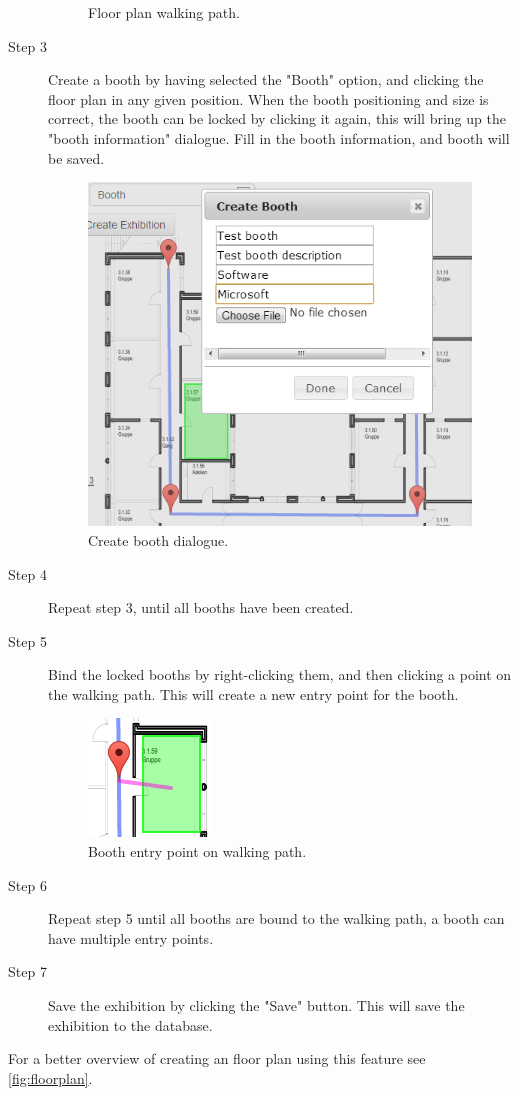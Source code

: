 \begin{description}
\begin{figure}[H]
		\caption{Floor plan walking path.\label{fig:websitestep2}}
	\end{figure}
	\item[Step 3] Create a booth by having selected the "Booth" option, and clicking the floor plan in any given position. When the booth positioning and size is correct, the booth can be locked by clicking it again, this will bring up the "booth information" dialogue. Fill in the booth information, and booth will be saved.
	\begin{figure}[H]
		\centering
		\includegraphics[scale=0.5]{img/website/step4.png}
		\caption{Create booth dialogue.\label{fig:websitestep3}}
	\end{figure}
	\item[Step 4] Repeat step 3, until all booths have been created.
	\item[Step 5] Bind the locked booths by right-clicking them, and then clicking a point on the walking path. This will create a new entry point for the booth.
	\begin{figure}[H]
		\centering
		\includegraphics[scale=0.5]{img/website/step5.png}
		\caption{Booth entry point on walking path.\label{fig:websitestep5}}
	\end{figure}
	\item[Step 6] Repeat step 5 until all booths are bound to the walking path, a booth can have multiple entry points.
	\item[Step 7] Save the exhibition by clicking the "Save" button. This will save the exhibition to the database.
\end{description}
For a better overview of creating an floor plan using this feature see \autoref{fig:floorplan}.

